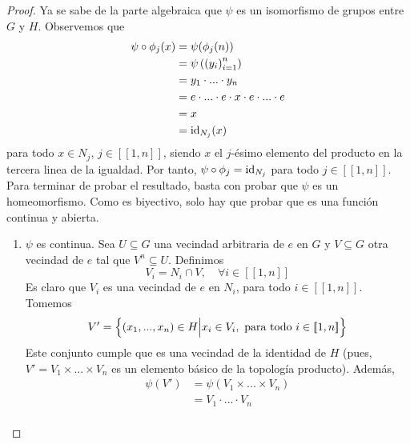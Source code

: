 \documentclass[12pt]{report}
\theoremstyle{largebreak}
\newcommand{\natint}[1]{\ensuremath{[\!\left[#1\right]\!]}}
\newcommand{\id}[1]{\ensuremath{\textup{id}_{#1}}}
\begin{document}
    \begin{proof}
        Ya se sabe de la parte algebraica que $\psi$ es un isomorfismo de grupos entre $G$ y $H$. Observemos que
        \begin{equation*}
            \begin{split}
                \psi\circ\phi_j(x)&=\psi(\phi_j(n))\\
                &=\psi\left(\left(y_i \right)_{ i=1}^n\right)\\
                &=y_1\cdot...\cdot y_n \\
                &=e\cdot...\cdot e\cdot x\cdot e\cdot...\cdot e\\
                &= x\\
                &= \id{N_j}(x) \\
            \end{split}
        \end{equation*}
        para todo $x\in N_j$, $j\in\natint{1,n}$, siendo $x$ el $j$-ésimo elemento del producto en la tercera linea de la igualdad. Por tanto, $\psi\circ\phi_j=\id{N_j}$ para todo $j\in\natint{1,n}$. Para terminar de probar el resultado, basta con probar que $\psi$ es un homeomorfismo. Como es biyectivo, solo hay que probar que es una función continua y abierta.
        \begin{enumerate}
            \item \textup{$\psi$ es continua}. Sea $U\subseteq G$ una vecindad arbitraria de $e$ en $G$ y $V\subseteq G$ otra vecindad de $e$ tal que $V^n\subseteq U$. Definimos
            \begin{equation*}
                V_i=N_i\cap V,\quad\forall i\in\natint{1,n}
            \end{equation*}
            Es claro que $V_i$ es una vecindad de $e$ en $N_i$, para todo $i\in\natint{1,n}$. Tomemos
            \begin{equation*}
                V'=\left\{(x_1,...,x_n)\in H\Big|x_i\in V_i,\textup{ para todo }i\in\natint{1,n} \right\}
            \end{equation*}
            Este conjunto cumple que es una vecindad de la identidad de $H$ (pues, $V'=V_1\times...\times V_n$ es un elemento básico de la topología producto). Además,
            \begin{equation*}
                \begin{split}
                    \psi(V')&=\psi(V_1\times...\times V_n)\\
                    &=V_1\cdot...\cdot V_n \\

\end{split}
\end{equation*}
\end{enumerate}
\end{proof}
\end{document}
